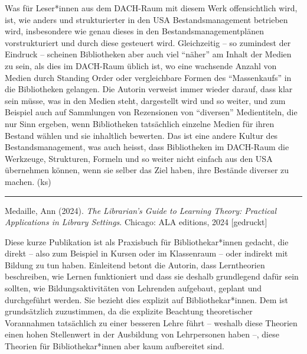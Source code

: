 \documentclass[a4paper,
fontsize=11pt,
oneside,
numbers=noperiodatend,
parskip=half-,
bibliography=totoc,
final
]{scrartcl}
\begin{document}
Was für Leser*innen aus dem DACH-Raum mit diesem Werk offensichtlich
wird, ist, wie anders und strukturierter in den USA Bestandsmanagement
betrieben wird, insbesondere wie genau dieses in den
Bestandsmanagementplänen vorstrukturiert und durch diese gesteuert wird.
Gleichzeitig -- so zumindest der Eindruck -- scheinen Bibliotheken aber
auch viel \enquote{näher} am Inhalt der Medien zu sein, als dies im
DACH-Raum üblich ist, wo eine wachsende Anzahl von Medien durch Standing
Order oder vergleichbare Formen des \enquote{Massenkaufs} in die
Bibliotheken gelangen. Die Autorin verweist immer wieder darauf, dass
klar sein müsse, was in den Medien steht, dargestellt wird und so
weiter, und zum Beispiel auch auf Sammlungen von Rezensionen von
\enquote{diversen} Medientiteln, die nur Sinn ergeben, wenn Bibliotheken
tatsächlich einzelne Medien für ihren Bestand wählen und sie inhaltlich
bewerten. Das ist eine andere Kultur des Bestandsmanagement, was auch
heisst, dass Bibliotheken im DACH-Raum die Werkzeuge, Strukturen,
Formeln und so weiter nicht einfach aus den USA übernehmen können, wenn
sie selber das Ziel haben, ihre Bestände diverser zu machen. (ks)

\begin{center}\rule{0.5\linewidth}{0.5pt}\end{center}

Medaille, Ann (2024). \emph{The Librarian's Guide to Learning Theory:
Practical Applications in Library Settings}. Chicago: ALA editions, 2024
{[}gedruckt{]}

Diese kurze Publikation ist als Praxisbuch für Bibliothekar*innen
gedacht, die direkt -- also zum Beispiel in Kursen oder im Klassenraum
-- oder indirekt mit Bildung zu tun haben. Einleitend betont die
Autorin, dass Lerntheorien beschreiben, wie Lernen funktioniert und dass
sie deshalb grundlegend dafür sein sollten, wie Bildungsaktivitäten von
Lehrenden aufgebaut, geplant und durchgeführt werden. Sie bezieht dies
explizit auf Bibliothekar*innen. Dem ist grundsätzlich zuzustimmen, da
die explizite Beachtung theoretischer Vorannahmen tatsächlich zu einer
besseren Lehre führt -- weshalb diese Theorien einen hohen Stellenwert
in der Ausbildung von Lehrpersonen haben --, diese Theorien für
Bibliothekar*innen aber kaum aufbereitet sind.
\end{document}
